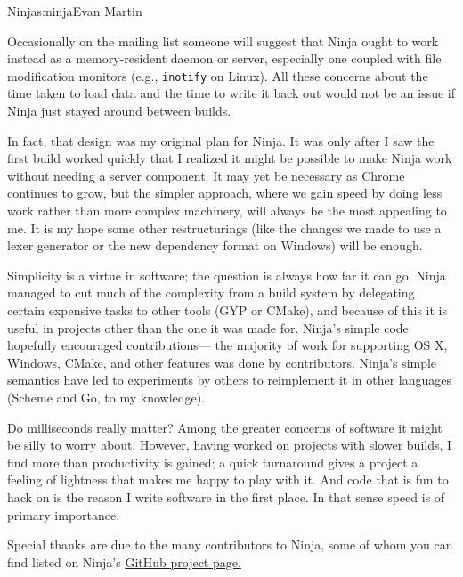 \begin{aosachapter}{Ninja}{s:ninja}{Evan Martin}

Occasionally on the mailing list someone will suggest that Ninja ought
to work instead as a memory-resident daemon or server, especially one
coupled with file modification monitors (e.g., \texttt{inotify} on
Linux). All these concerns about the time taken to load data and the
time to write it back out would not be an issue if Ninja just stayed
around between builds.

In fact, that design was my original plan for Ninja. It was only after I
saw the first build worked quickly that I realized it might be possible
to make Ninja work without needing a server component. It may yet be
necessary as Chrome continues to grow, but the simpler approach, where
we gain speed by doing less work rather than more complex machinery,
will always be the most appealing to me. It is my hope some other
restructurings (like the changes we made to use a lexer generator or the
new dependency format on Windows) will be enough.

Simplicity is a virtue in software; the question is always how far it
can go. Ninja managed to cut much of the complexity from a build system
by delegating certain expensive tasks to other tools (GYP or CMake), and
because of this it is useful in projects other than the one it was made
for. Ninja's simple code hopefully encouraged contributions--- the
majority of work for supporting OS X, Windows, CMake, and other features
was done by contributors. Ninja's simple semantics have led to
experiments by others to reimplement it in other languages (Scheme and
Go, to my knowledge).

Do milliseconds really matter? Among the greater concerns of software it
might be silly to worry about. However, having worked on projects with
slower builds, I find more than productivity is gained; a quick
turnaround gives a project a feeling of lightness that makes me happy to
play with it. And code that is fun to hack on is the reason I write
software in the first place. In that sense speed is of primary
importance.


Special thanks are due to the many contributors to Ninja, some of whom
you can find listed on Ninja's
\href{https://github.com/martine/ninja/contributors}{GitHub project
page.}

\end{aosachapter}
